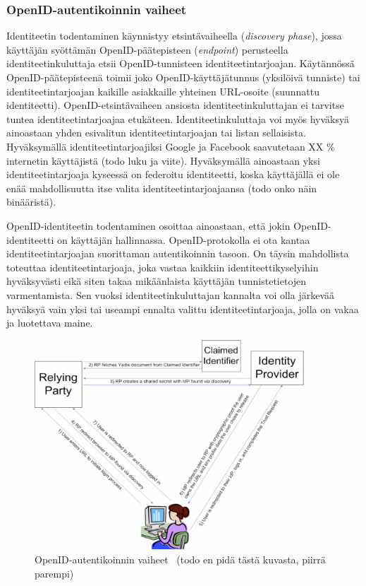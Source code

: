 \documentclass[finnish,gradu]{tktltiki}
\begin{document}
  \subsubsection{OpenID-autentikoinnin vaiheet} %
  \label{ssub:openid_autentikoinnin_vaiheet}

  Identiteetin todentaminen käynnistyy etsintävaiheella (\emph{discovery phase}), jossa käyttäjän syöttämän OpenID-päätepisteen (\emph{endpoint}) perusteella identiteetinkuluttaja etsii OpenID-tunnisteen identiteetintarjoajan. Käytännössä OpenID-päätepisteenä toimii joko OpenID-käyttäjätunnus (yksilöivä tunniste) tai identiteetintarjoajan kaikille asiakkaille yhteinen URL-osoite (suunnattu identiteetti). OpenID-etsintävaiheen ansiosta identiteetinkuluttajan ei tarvitse tuntea identiteetintarjoajaa etukäteen. Identiteetinkuluttaja voi myös hyväksyä ainoastaan yhden esivalitun identiteetintarjoajan tai listan sellaisista. Hyväksymällä identiteetintarjoajiksi Google ja Facebook saavutetaan XX \% internetin käyttäjistä (todo luku ja viite). Hyväksymällä ainoastaan yksi identiteetintarjoaja kyseessä on federoitu identiteetti, koska käyttäjällä ei ole enää mahdollisuutta itse valita identiteetintarjoajaansa (todo onko näin binääristä).

  OpenID-identiteetin todentaminen osoittaa ainoastaan, että jokin OpenID-identiteetti on käyttäjän hallinnassa. OpenID-protokolla ei ota kantaa identiteetintarjoajan suorittaman autentikoinnin tasoon. On täysin mahdollista toteuttaa identiteetintarjoaja, joka vastaa kaikkiin identiteettikyselyihin hyväksyvästi eikä siten takaa mikäänlaista käyttäjän tunnistetietojen varmentamista. Sen vuoksi identiteetinkuluttajan kannalta voi olla järkevää hyväksyä vain yksi tai useampi ennalta valittu identiteetintarjoaja, jolla on vakaa ja luotettava maine.


  \begin{figure}
    \centering
    \includegraphics[width=0.9\textwidth]{images/openid_flow_recordon06.jpg}
    \caption{OpenID-autentikoinnin vaiheet~\cite{openid_recordon_2009} (todo en pidä tästä kuvasta, piirrä parempi)}
    \label{fig:basic_openid_flow}
  \end{figure}
\end{document}
